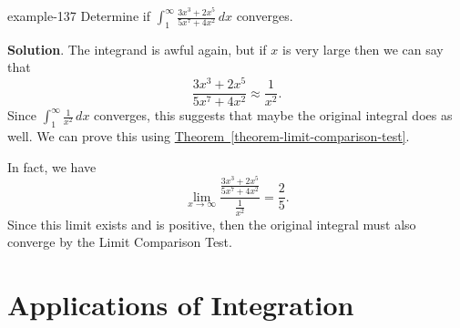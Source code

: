 \documentclass[10pt,]{book}
\numberwithin{equation}{section}
\begin{document}
\begin{example}{}{example-137}%
\hypertarget{p-610}{}%
Determine if \(\displaystyle\int_{1}^{\infty}\frac{3x^{3} + 2x^{5}}{5x^{7} + 4x^{2}}\,dx\) converges.%
\par\smallskip%
\noindent\textbf{Solution}.\hypertarget{solution-133}{}\quad%
\hypertarget{p-611}{}%
The integrand is awful again, but if \(x\) is very large then we can say that%
\begin{equation*}
\frac{3x^{3} + 2x^{5}}{5x^{7} + 4x^{2}} \approx \frac{1}{x^{2}}.
\end{equation*}
Since \(\int_{1}^{\infty}\frac{1}{x^{2}}\,dx\) converges, this suggests that maybe the original integral does as well. We can prove this using \hyperref[theorem-limit-comparison-test]{Theorem~\ref{theorem-limit-comparison-test}}.%
\par
\hypertarget{p-612}{}%
In fact, we have%
\begin{equation*}
\lim_{x\to\infty}\frac{\frac{3x^{3} + 2x^{5}}{5x^{7} + 4x^{2}}}{\frac{1}{x^{2}}} = \frac{2}{5}.
\end{equation*}
Since this limit exists and is positive, then the original integral must also converge by the Limit Comparison Test.%
\end{example}
%
%
\typeout{************************************************}
\typeout{************************************************}
%
\chapter[{Applications of Integration}]{Applications of Integration}\label{applications-of-integration}
%
%
\typeout{************************************************}
\typeout{************************************************}
%
\end{document}

